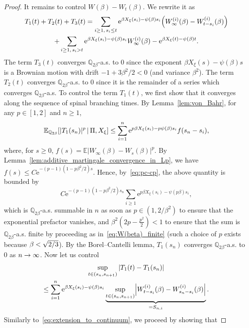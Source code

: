 \documentclass[AHL,Unicode,longabstracts,published]{cedram}
\newcommand{\e}{\mathrm{e}}
\newcommand{\E}{\mathbb{E}}
\newcommand{\Q}{\mathbb{Q}}
\newcommand\1{\mathds{1}}
\let\originalleft\left
\let\originalright\right
\renewcommand{\left}{\mathopen{}\mathclose\bgroup\originalleft}
\renewcommand{\right}{\aftergroup\egroup\originalright}
\renewcommand*{\to}{\mathchoice{\longrightarrow}{\rightarrow}{\rightarrow}{\rightarrow}}
\begin{document}
\begin{proof}
It remains to control $W(\beta) - W_t(\beta)$. We rewrite it as
\begin{multline*}
T_1(t) + T_2(t) + T_3(t)  = \sum_{i \geq 1,\, s_i \leq t} \e^{\beta X_\xi(s_i) - \psi(\beta)s_i} \left(W_\infty^{(i)}(\beta) - W_{t - s_i}^{(i)}(\beta)\right) \\
+ \sum_{i \geq 1,\, s_i > t} \e^{\beta X_\xi(s_i) - \psi(\beta)s_i} W_\infty^{(i)}(\beta)- \e^{\beta X_\xi(t) - \psi(\beta)t}. 
\end{multline*}
The term $T_3(t)$ converges $\Q_{2\beta}$-a.s. to $0$ since the exponent $\beta X_\xi(s) - \psi(\beta)s$ is a Brownian motion with drift $-1 + 3\beta^2/2 < 0$ (and variance $\beta^2$). The term $T_2(t)$ converges $\Q_{2\beta}$-a.s. to $0$ since it is the remainder of a series which converges $\Q_{2\beta}$-a.s. To control the term $T_1(t)$, we first show that it converges along the sequence of spinal branching times. By Lemma~\ref{lem:von_Bahr}, for any $p \in [1, 2]$ and $n \geq 1$,
\begin{equation*}
\E_{\Q_{2\beta}} \left[|T_1(s_n)|^p \,\middle|\, \Pi, X_\xi \right] \leq \sum_{i = 1}^n \e^{p \beta X_\xi(s_i) - p \psi(\beta) s_i} f(s_n - s_i),
\end{equation*}
where, for $s \geq 0$, $f(s) = \E|W_\infty(\beta) - W_s(\beta)|^p$. By Lemma~\ref{lem:additive_martingale_convergence_in_Lp}, we have $f(s) \leq C \e^{-(p - 1)(1 - p\beta^2/2)s}$. Hence, by~\eqref{eq:pc-cp}, the above quantity is bounded by
\begin{equation*}
C \e^{-(p - 1)(1 - p\beta^2/2)s_n} \sum_{i \geq 1} \e^{p \beta X_\xi(s_i) - \psi(p \beta) s_i},
\end{equation*}
which is $\Q_{2\beta}$-a.s. summable in $n$ as soon as $p \in (1, 2/\beta^2)$ to ensure that the exponential prefactor vanishes, and $\beta^2 (2p-\frac{p^2}{2}) < 1$ to ensure that the sum is $\Q_{2\beta}$-a.s. finite by proceeding as in~\eqref{eq:W(beta)_finite} (such a choice of $p$ exists because $\beta < \sqrt{2\smash{/}3}$). By the Borel--Cantelli lemma, $T_1(s_n)$ converges $\Q_{2\beta}$-a.s. to $0$ as $n \to \infty$. Now let us control
\begin{multline}\label{eq:T1_extension_to_continuum}
 \sup_{t \in (s_n, s_{n+1})} |T_1(t) - T_1(s_n)| \\
\leq \sum_{i = 1}^n \e^{\beta X_\xi(s_i) - \psi(\beta)s_i} \underbrace{\sup_{t \in (s_n, s_{n+1})} \left| W_{t - s_i}^{(i)}(\beta) - W_{s_n - s_i}^{(i)}(\beta) \right|}_{= S_{n, i}}.
\end{multline}
Similarly to~\eqref{eq:extension_to_continuum}, we proceed by showing that

\end{proof}
\end{document}
